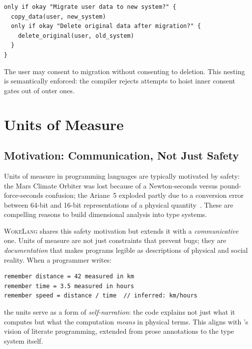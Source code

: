 \documentclass[11pt,a4paper]{article}
\newcommand{\WokeLang}{\textsc{WokeLang}}
\begin{document}
\begin{lstlisting}[caption={Nested consent gates}]
only if okay "Migrate user data to new system?" {
  copy_data(user, new_system)
  only if okay "Delete original data after migration?" {
    delete_original(user, old_system)
  }
}
\end{lstlisting}

The user may consent to migration without consenting to deletion.
This nesting is semantically enforced: the compiler rejects attempts
to hoist inner consent gates out of outer ones.

\section{Units of Measure}
\label{sec:units}

\subsection{Motivation: Communication, Not Just Safety}

Units of measure in programming languages are typically motivated by
safety: the Mars Climate Orbiter was lost because of a
Newton-seconds versus pound-force-seconds confusion; the Ariane~5
exploded partly due to a conversion error between 64-bit and 16-bit
representations of a physical quantity~\citep{lions1996ariane}.  These
are compelling reasons to build dimensional analysis into type systems.

\WokeLang{} shares this safety motivation but extends it with a
\emph{communicative} one.  Units of measure are not just constraints
that prevent bugs; they are \emph{documentation} that makes programs
legible as descriptions of physical and social reality.  When a
programmer writes:

\begin{lstlisting}[caption={Units as communication}]
remember distance = 42 measured in km
remember time = 3.5 measured in hours
remember speed = distance / time  // inferred: km/hours
\end{lstlisting}

the units serve as a form of \emph{self-narration}: the code explains
not just what it computes but what the computation \emph{means} in
physical terms.  This aligns with \citeauthor{knuth1984literate}'s
vision of literate programming, extended from prose annotations to the
type system itself.
\end{document}
